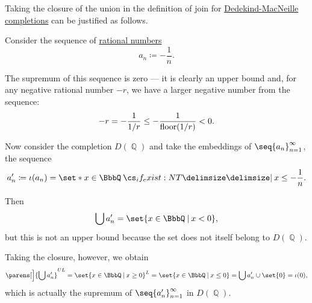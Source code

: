\begin{example}\label{ex:dedekind_macnielle_join_closure}
  Taking the closure of the union in the definition of join for \hyperref[def:dedekind_macnielle_completion]{Dedekind-MacNeille completions} can be justified as follows.

  Consider the sequence of \hyperref[def:rational_numbers]{rational numbers}
  \begin{equation*}
    a_n \coloneqq -\frac 1 n.
  \end{equation*}

  The supremum of this sequence is zero --- it is clearly an upper bound and, for any negative rational number \( -r \), we have a larger negative number from the sequence:
  \begin{equation*}
    -r
    =
    -\frac 1 {\ifrac 1 r}
    \leq
    -\frac 1 {\floor(\ifrac 1 r)}
    <
    0.
  \end{equation*}

  Now consider the completion \( D(\BbbQ) \) and take the embeddings of \( \seq{ a_n }_{n=1}^\infty \), the sequence
  \begin{equation*}
    a_n' \coloneqq \iota(a_n) = \set*{ x \in \BbbQ \given* x \leq -\frac 1 n }.
  \end{equation*}

  Then
  \begin{equation*}
    \bigcup a_n' = \set{ x \in \BbbQ \given x < 0 },
  \end{equation*}
  but this is not an upper bound because the set does not itself belong to \( D(\BbbQ) \).

  Taking the closure, however, we obtain
  \begin{equation*}
    \parens[\Big]{ \bigcup a_n' }^{UL}
    =
    \set{ x \in \BbbQ \given x \geq 0 }^L
    =
    \set{ x \in \BbbQ \given x \leq 0 }
    =
    \bigcup a_n' \cup \set{ 0 }
    =
    \iota(0),
  \end{equation*}
  which is actually the supremum of \( \seq{ a_n' }_{n=1}^\infty \) in \( D(\BbbQ) \).
\end{example}

